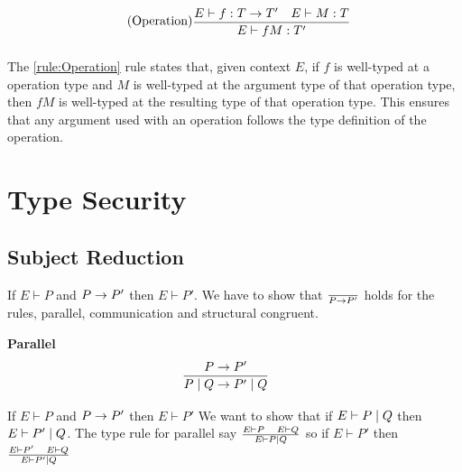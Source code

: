 \begin{align*}
\tag{Operation}\label{rule:Operation} &\infrule{E\vdash f:T\ra T'\quad E\vdash M:T}{E\vdash fM:T'}
\end{align*}
The \ref{rule:Operation} rule states that, given context $E$, if $f$ is well-typed at a operation type and $M$ is well-typed at the argument type of that operation type, then $fM$ is well-typed at the resulting type of that operation type.
This ensures that any argument used with an operation follows the type definition of the operation.


\section{Type Security}

\subsection{Subject Reduction}
If \ensuremath{E \vdash P} and \ensuremath{P\ra P'} then \ensuremath{E \vdash P'}.
We have to show that \ensuremath{\frac{}{P \ra P'}} holds for the rules, parallel, communication and structural congruent.

\textbf{Parallel}
\begin{align*}
\infrule{P \ra P'}{P \para Q \ra P' \para Q}
\end{align*}
If \ensuremath{E \vdash P} and \ensuremath{P \ra P'} then \ensuremath{E \vdash P'} We want to show that if \ensuremath{E \vdash P \para Q} then \ensuremath{E \vdash P' \para Q}. The type rule for parallel say \ensuremath{\frac{E \vdash P\quad E \vdash Q}{E \vdash P \para Q}} so if \ensuremath{E \vdash P'} then \ensuremath{\frac{E \vdash P' \quad E \vdash Q}{E \vdash P' \para Q}}

